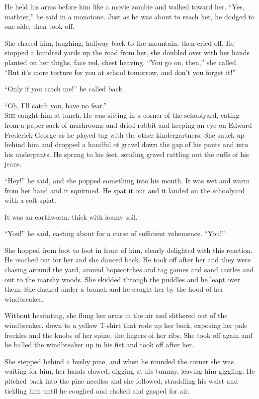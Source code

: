 \documentclass{article}
\begin{document}
He held his arms before him like a movie zombie and walked toward her. 
``Yes, mathter,'' he said in a monotone.  Just as he was about to
reach her, he dodged to one side, then took off.

She chased him, laughing, halfway back to the mountain, then cried
off.  He stopped a hundred yards up the road from her, she doubled
over with her hands planted on her thighs, face red, chest heaving. 
``You go on, then,'' she called.  ``But it's more torture for you at
school tomorrow, and don't you forget it!''

``Only if you catch me!'' he called back.

``Oh, I'll catch you, have no fear.''
\\
\lettrine[lines=3, lhang=.5, nindent=0pt, findent=2pt]{S}{he} caught him at lunch.  He was sitting in a corner of the
schoolyard, eating from a paper sack of mushrooms and dried rabbit and
keeping an eye on Edward-Frederick-George as he played tag with the
other kindergartners.  She snuck up behind him and dropped a handful
of gravel down the gap of his pants and into his underpants.  He
sprang to his feet, sending gravel rattling out the cuffs of his
jeans.

``Hey!'' he said, and she popped something into his mouth.  It was wet
and warm from her hand and it squirmed.  He spat it out and it landed
on the schoolyard with a soft splat.

It was an earthworm, thick with loamy soil.

``You!'' he said, casting about for a curse of sufficient vehemence. 
``You!''

She hopped from foot to foot in front of him, clearly delighted with
this reaction.  He reached out for her and she danced back.  He took
off after her and they were chasing around the yard, around
hopscotches and tag games and sand castles and out to the marshy
woods.  She skidded through the puddles and he leapt over them.  She
ducked under a branch and he caught her by the hood of her
windbreaker.

Without hesitating, she flung her arms in the air and slithered out of
the windbreaker, down to a yellow T-shirt that rode up her back,
exposing her pale freckles and the knobs of her spine, the fingers of
her ribs.  She took off again and he balled the windbreaker up in his
fist and took off after her.

She stepped behind a bushy pine, and when he rounded the corner she
was waiting for him, her hands clawed, digging at his tummy, leaving
him giggling.  He pitched back into the pine needles and she followed,
straddling his waist and tickling him until he coughed and choked and
gasped for air.
\end{document}

